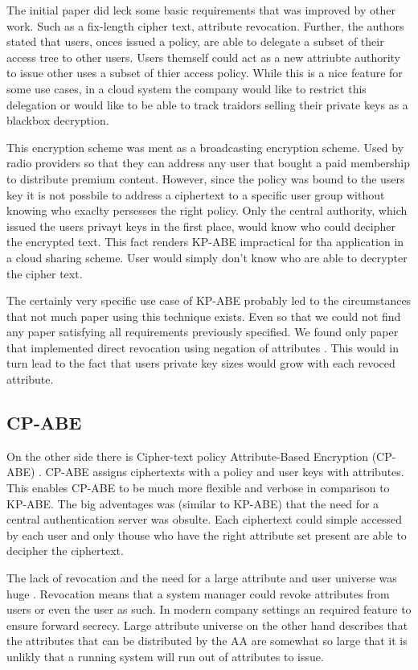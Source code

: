 The initial paper did leck some basic requirements that was improved by other work. Such as a fix-length cipher text, attribute revocation. Further, the authors stated that users, onces issued a policy, are able to delegate a subset of their access tree to other users. Users themself could act as a new attriubte authority to issue other uses a subset of thier access policy. While this is a nice feature for some use cases, in a cloud system the company would like to restrict this delegation or would like to be able to track traidors selling their private keys as a blackbox decryption.

This encryption scheme was ment as a broadcasting encryption scheme. Used by radio providers so that they can address any user that bought a paid membership to distribute premium content. However, since the policy was bound to the users key it is not possbile to address a ciphertext to a specific user group without knowing who exaclty persesses the right policy. Only the central authority, which issued the users privayt keys in the first place, would know who could decipher the encrypted text. This fact renders KP-ABE impractical for tha application in a cloud sharing scheme. User would simply don't know who are able to decrypter the cipher text. 

The certainly very specific use case of KP-ABE probably led to the circumstances that not much paper using this technique exists. Even so that we could not find any paper satisfying all requirements previously specified. We found only paper that implemented direct revocation using negation of attributes \cite{lewko2010revocation}. This would in turn lead to the fact that users private key sizes would grow with each revoced attribute. 

\subsection{CP-ABE}
On the other side there is Cipher-text policy Attribute-Based Encryption (CP-ABE) \cite{bethencourt2007ciphertext}. CP-ABE assigns ciphertexts with a policy and user keys with attributes. This enables CP-ABE to be much more flexible and verbose in comparison to KP-ABE. The big adventages was (similar to KP-ABE) that the need for a central authentication server was obsulte. Each ciphertext could simple accessed by each user and only thouse who have the right attribute set present are able to decipher the ciphertext. 

The lack of revocation  and the need for a large attribute and user universe was huge . Revocation means that a system manager could revoke attributes from users or even the user as such. In modern company settings an required feature to ensure forward secrecy. Large attribute universe on the other hand describes that the attributes that can be distributed by the AA are somewhat so large that it is unlikly that a running system will run out of attributes to issue. 

